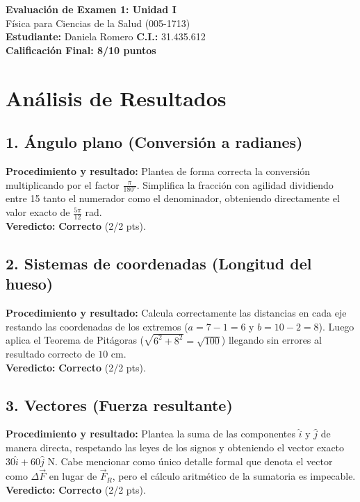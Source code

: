 \documentclass[12pt]{article}
\begin{document}
\begin{center}
    \Large \textbf{Evaluación de Examen 1: Unidad I} \\
    \large Física para Ciencias de la Salud (005-1713) \\
    \vspace{0.5cm}
    \textbf{Estudiante:} Daniela Romero \quad \textbf{C.I.:} 31.435.612
    \vspace{0.3cm} \\
    \large \textbf{Calificación Final: 8/10 puntos}
\end{center}

\vspace{0.5cm}

\section*{Análisis de Resultados}

\subsection*{1. Ángulo plano (Conversión a radianes)}
\textbf{Procedimiento y resultado:} Plantea de forma correcta la conversión multiplicando por el factor $\frac{\pi}{180^\circ}$. Simplifica la fracción con agilidad dividiendo entre 15 tanto el numerador como el denominador, obteniendo directamente el valor exacto de $\frac{5\pi}{12}$ rad. \\
\textbf{Veredicto:} \textbf{Correcto} (2/2 pts).

\subsection*{2. Sistemas de coordenadas (Longitud del hueso)}
\textbf{Procedimiento y resultado:} Calcula correctamente las distancias en cada eje restando las coordenadas de los extremos ($a = 7-1=6$ y $b = 10-2=8$). Luego aplica el Teorema de Pitágoras ($\sqrt{6^2 + 8^2} = \sqrt{100}$) llegando sin errores al resultado correcto de $10$ cm. \\
\textbf{Veredicto:} \textbf{Correcto} (2/2 pts).

\subsection*{3. Vectores (Fuerza resultante)}
\textbf{Procedimiento y resultado:} Plantea la suma de las componentes $\hat{i}$ y $\hat{j}$ de manera directa, respetando las leyes de los signos y obteniendo el vector exacto $30\hat{i} + 60\hat{j}$ N. Cabe mencionar como único detalle formal que denota el vector como $\Delta\vec{F}$ en lugar de $\vec{F}_R$, pero el cálculo aritmético de la sumatoria es impecable. \\
\textbf{Veredicto:} \textbf{Correcto} (2/2 pts).
\end{document}
